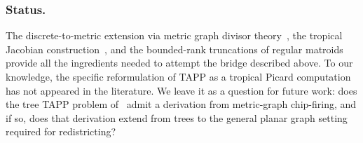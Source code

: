 \documentclass[11pt]{article}
\begin{document}
\subsubsection*{Status.}

The discrete-to-metric extension via metric graph divisor
theory~\cite{baker2007riemann}, the tropical Jacobian
construction~\cite{mikhalkin2008tropical}, and the bounded-rank
truncations of regular matroids~\cite{backman2019geometric} provide all
the ingredients needed to attempt the bridge described above. To our
knowledge, the specific reformulation of TAPP as a tropical Picard
computation has not appeared in the literature. We leave it as a
question for future work: does the tree TAPP problem
of~\cite{akitaya2026bud} admit a derivation from metric-graph
chip-firing, and if so, does that derivation extend from trees to the
general planar graph setting required for redistricting?




\end{document}
